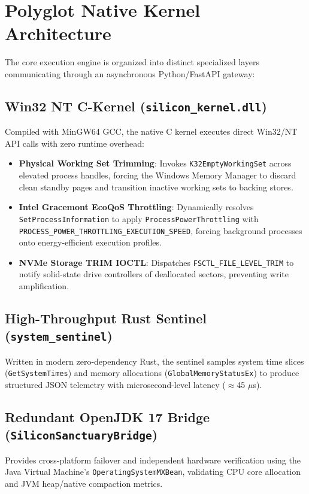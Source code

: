\documentclass[11pt,a4paper]{article}
\begin{document}
\section{Polyglot Native Kernel Architecture}
The core execution engine is organized into distinct specialized layers communicating through an asynchronous Python/FastAPI gateway:

\subsection{Win32 NT C-Kernel (\texttt{silicon\_kernel.dll})}
Compiled with MinGW64 GCC, the native C kernel executes direct Win32/NT API calls with zero runtime overhead:
\begin{itemize}
    \item \textbf{Physical Working Set Trimming}: Invokes \texttt{K32EmptyWorkingSet} across elevated process handles, forcing the Windows Memory Manager to discard clean standby pages and transition inactive working sets to backing stores.
    \item \textbf{Intel Gracemont EcoQoS Throttling}: Dynamically resolves \texttt{SetProcessInformation} to apply \texttt{ProcessPowerThrottling} with \texttt{PROCESS\_POWER\_THROTTLING\_EXECUTION\_SPEED}, forcing background processes onto energy-efficient execution profiles.
    \item \textbf{NVMe Storage TRIM IOCTL}: Dispatches \texttt{FSCTL\_FILE\_LEVEL\_TRIM} to notify solid-state drive controllers of deallocated sectors, preventing write amplification.
\end{itemize}

\subsection{High-Throughput Rust Sentinel (\texttt{system\_sentinel})}
Written in modern zero-dependency Rust, the sentinel samples system time slices (\texttt{GetSystemTimes}) and memory allocations (\texttt{GlobalMemoryStatusEx}) to produce structured JSON telemetry with microsecond-level latency ($\approx$45 $\mu$s).

\subsection{Redundant OpenJDK 17 Bridge (\texttt{SiliconSanctuaryBridge})}
Provides cross-platform failover and independent hardware verification using the Java Virtual Machine's \texttt{OperatingSystemMXBean}, validating CPU core allocation and JVM heap/native compaction metrics.
\end{document}
